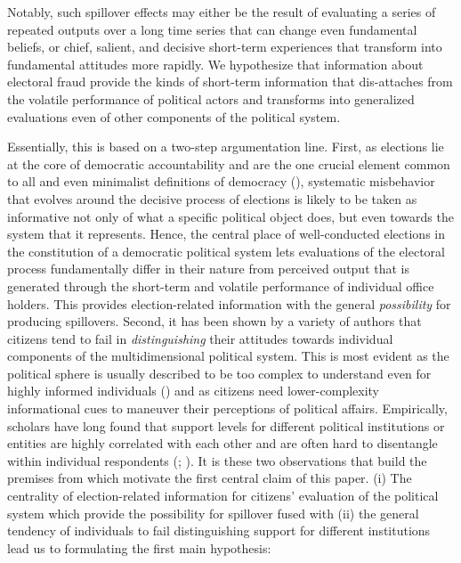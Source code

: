 \documentclass[11pt, ngerman,english,a4]{article}
\begin{document}
Notably, such spillover effects may either be the result of evaluating a series of repeated outputs over a long time series that can change even fundamental beliefs, or chief, salient, and decisive short-term experiences that transform into fundamental attitudes more rapidly. We hypothesize that information about electoral fraud provide the kinds of short-term information that dis-attaches from the volatile performance of political actors and transforms into generalized evaluations even of other components of the political system. 

Essentially, this is based on a two-step argumentation line. First, as elections lie at the core of democratic accountability and are the one crucial element common to all and even minimalist definitions of democracy (\citealt{przeworski_stokes_manin_1999}), systematic misbehavior that evolves around the decisive process of elections is likely to be taken as informative not only of what a specific political object does, but even towards the system that it represents. Hence, the central place of well-conducted elections in the constitution of a democratic political system lets evaluations of the electoral process fundamentally differ in their nature from perceived output that is generated through the short-term and volatile performance of individual office holders. This provides election-related information with the general \textit{possibility} for producing spillovers. Second, it has been shown by a variety of authors that citizens tend to fail in \textit{distinguishing} their attitudes towards individual components of the multidimensional political system. This is most evident as the political sphere is usually described to be too complex to understand even for highly informed individuals (\citealt{zaller_1992}) and as citizens need lower-complexity informational cues to maneuver their perceptions of political affairs. Empirically, scholars have long found that support levels for different political institutions or entities are highly correlated with each other and are often hard to disentangle within individual respondents (\citealt{Hooghe2012}; \citealt{Mishler2001}). It is these two observations that build the premises from which motivate the first central claim of this paper. (i) The  centrality of election-related information for citizens' evaluation of the political system which provide the possibility for spillover fused with (ii) the general tendency of individuals to fail distinguishing support for different institutions lead us to formulating the first main hypothesis: \\
	
\end{document}
